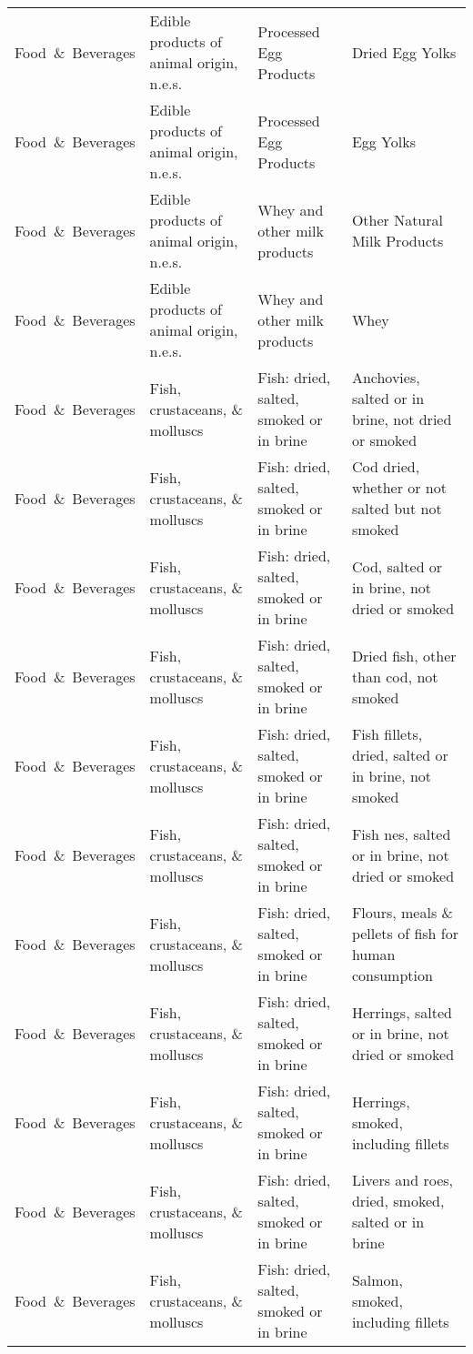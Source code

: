 \begin{appendices}
\begin{xltabular}{\textwidth}{|p{0.10\textwidth}|p{0.30\textwidth}|p{0.20\textwidth}|p{0.30\textwidth}|}
		Food\ \&\ Beverages & Edible products of animal origin, n.e.s. & Processed Egg Products & Dried Egg Yolks \\
		Food\ \&\ Beverages & Edible products of animal origin, n.e.s. & Processed Egg Products & Egg Yolks \\
		Food\ \&\ Beverages & Edible products of animal origin, n.e.s. & Whey and other milk products & Other Natural Milk Products \\
		Food\ \&\ Beverages & Edible products of animal origin, n.e.s. & Whey and other milk products & Whey \\
		Food\ \&\ Beverages & Fish, crustaceans, \& molluscs & Fish: dried, salted, smoked or in brine & Anchovies, salted or in brine, not dried or smoked \\
		Food\ \&\ Beverages & Fish, crustaceans, \& molluscs & Fish: dried, salted, smoked or in brine & Cod dried, whether or not salted but not smoked \\
		Food\ \&\ Beverages & Fish, crustaceans, \& molluscs & Fish: dried, salted, smoked or in brine & Cod, salted or in brine, not dried or smoked \\
		Food\ \&\ Beverages & Fish, crustaceans, \& molluscs & Fish: dried, salted, smoked or in brine & Dried fish, other than cod, not smoked \\
		Food\ \&\ Beverages & Fish, crustaceans, \& molluscs & Fish: dried, salted, smoked or in brine & Fish fillets, dried, salted or in brine, not smoked \\
		Food\ \&\ Beverages & Fish, crustaceans, \& molluscs & Fish: dried, salted, smoked or in brine & Fish nes, salted or in brine, not dried or smoked \\
		Food\ \&\ Beverages & Fish, crustaceans, \& molluscs & Fish: dried, salted, smoked or in brine & Flours, meals \& pellets of fish for human consumption \\
		Food\ \&\ Beverages & Fish, crustaceans, \& molluscs & Fish: dried, salted, smoked or in brine & Herrings, salted or in brine, not dried or smoked \\
		Food\ \&\ Beverages & Fish, crustaceans, \& molluscs & Fish: dried, salted, smoked or in brine & Herrings, smoked, including fillets \\
		Food\ \&\ Beverages & Fish, crustaceans, \& molluscs & Fish: dried, salted, smoked or in brine & Livers and roes, dried, smoked, salted or in brine \\
		Food\ \&\ Beverages & Fish, crustaceans, \& molluscs & Fish: dried, salted, smoked or in brine & Salmon, smoked, including fillets \\

\end{xltabular}
\end{appendices}
